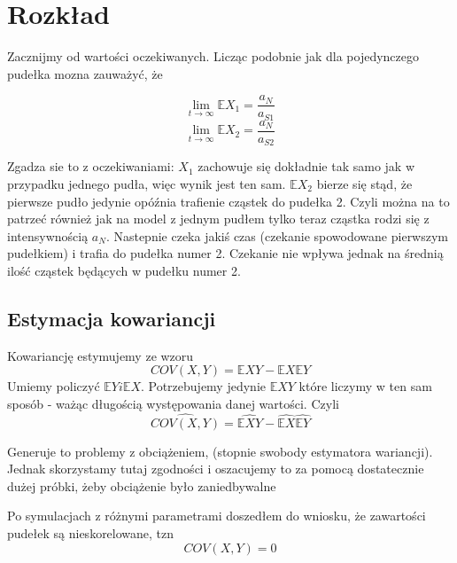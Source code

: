 \documentclass{article}
\begin{document}
\section{Rozkład}

Zacznijmy od wartości oczekiwanych. Licząc podobnie jak dla pojedynczego pudełka mozna zauważyć, że 

\[\lim_{t\rightarrow \infty}\mathbb{E}X_1 = \frac{a_N}{a_{S1}} \]
\[\lim_{t\rightarrow \infty}\mathbb{E}X_2 = \frac{a_N}{a_{S2}} \]

Zgadza sie to z oczekiwaniami:
$X_1$ zachowuje się dokładnie tak samo jak w przypadku jednego pudła, więc wynik jest ten sam. $\mathbb{E}X_2$ bierze się stąd, że pierwsze pudło jedynie opóźnia trafienie cząstek do pudełka 2. Czyli można na to patrzeć również jak na model z jednym pudłem tylko teraz cząstka rodzi się z intensywnością $a_N$. Nastepnie czeka jakiś czas (czekanie spowodowane pierwszym pudełkiem) i trafia do pudełka numer 2. Czekanie nie wpływa jednak na średnią ilość cząstek będących w pudełku numer 2.

\subsection{Estymacja kowariancji}

Kowariancję estymujemy ze wzoru \[COV(X,Y) = \mathbb{E}XY - \mathbb{E}X \mathbb{E}Y \] Umiemy policzyć $\mathbb{E}Y i \mathbb{E}X$. Potrzebujemy jedynie $\mathbb{E}XY$ które liczymy w ten sam sposób - ważąc długością występowania danej wartości. Czyli \[\hat{COV(X,Y)} = \hat{\mathbb{E}XY} - \hat{\mathbb{E}X} \hat{\mathbb{E}Y}\]

Generuje to problemy z obciążeniem, (stopnie swobody estymatora wariancji). Jednak skorzystamy tutaj zgodności i oszacujemy to za pomocą dostatecznie dużej próbki, żeby obciążenie było zaniedbywalne

Po symulacjach z różnymi parametrami doszedłem do wniosku, że zawartości pudełek są nieskorelowane, tzn \[COV(X,Y) = 0\]
\end{document}
